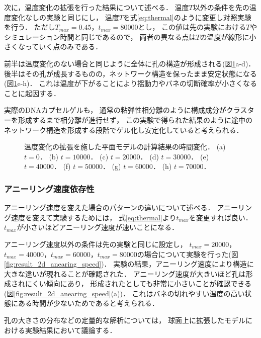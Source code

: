 次に，温度変化の拡張を行った結果について述べる．
温度$T$以外の条件を先の温度変化なしの実験と同じにし，
温度$T$を式\ref{eq:thermal}のように変更し対照実験を行う．
ただし$T_{max}=0.45$，$t_{max}=80000$とし，
この値は先の実験における$T$やシミュレーション時間と同じであるので，
両者の異なる点は$T$の温度が線形に小さくなっていく点のみである．

前半は温度変化のない場合と同じように全体に孔の構造が形成される(図\ref{fig:result_2d_with_anearing}a-d)．
後半はその孔が成長するものの，ネットワーク構造を保ったまま安定状態になる(図\ref{fig:result_2d_with_anearing}e-h)．
これは温度が下がることにより揺動力やバネの切断確率が小さくなることに起因する．

実際のDNAカプセルゲルも，
通常の粘弾性相分離のように構成成分がクラスターを形成するまで相分離が進行せず，
この実験で得られた結果のように途中のネットワーク構造を形成する段階でゲル化し安定化していると考えられる．

\begin{figure}
\centering

\caption{
    温度変化の拡張を施した平面モデルの計算結果の時間変化．
    (a) $t=0$．
    (b) $t=10000$．
    (c) $t=20000$．
    (d) $t=30000$．
    (e) $t=40000$．
    (f) $t=50000$．
    (g) $t=60000$．
    (h) $t=70000$．
}
\label{fig:result_2d_with_anearing}
\end{figure}

\subsubsection{アニーリング速度依存性}
アニーリング速度を変えた場合のパターンの違いについて述べる．
アニーリング速度を変えて実験するためには，
式\ref{eq:thermal}より$t_{max}$を変更すれば良い．
$t_{max}$が小さいほどアニーリング速度が速いことになる．

アニーリング速度以外の条件は先の実験と同じに設定し，
$t_{max}=20000$，$t_{max}=40000$，$t_{max}=60000$，$t_{max}=80000$の場合について実験を行った(図\ref{fig:result_2d_anearing_speed})．
実験の結果，アニーリング速度により構造に大きな違いが現れることが確認された．
アニーリング速度が大きいほど孔は形成されにくい傾向にあり，
形成されたとしても非常に小さいことが確認できる(図\ref{fig:result_2d_anearing_speed}(a))．
これはバネの切れやすい温度の高い状態にある時間が少ないためであると考えられる．

孔の大きさの分布などの定量的な解析については，
球面上に拡張したモデルにおける実験結果において議論する．


